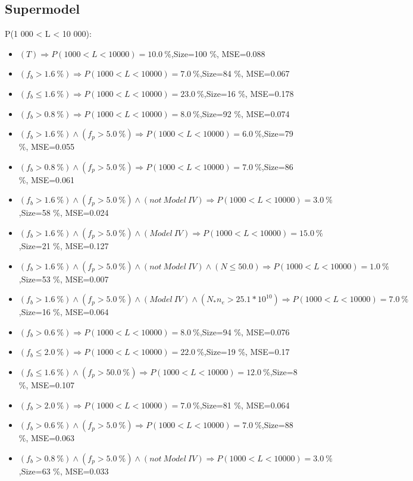\documentclass[numbered]{CSL}
\begin{document}
\subsection{Supermodel}
P(1 000 < L < 10 000):
\begin{itemize}
\item $(T) \Rightarrow P(1 000 < L < 10 000) = 10.0~\%$,\hfill Size=100 \%, MSE=0.088
\item $(f_b > 1.6~\%) \Rightarrow P(1 000 < L < 10 000) = 7.0~\%$,\hfill Size=84 \%, MSE=0.067
\item $(f_b \leq 1.6~\%) \Rightarrow P(1 000 < L < 10 000) = 23.0~\%$,\hfill Size=16 \%, MSE=0.178
\item $(f_b > 0.8~\%) \Rightarrow P(1 000 < L < 10 000) = 8.0~\%$,\hfill Size=92 \%, MSE=0.074
\item $(f_b > 1.6~\%) \land (f_p > 5.0~\%) \Rightarrow P(1 000 < L < 10 000) = 6.0~\%$,\hfill Size=79 \%, MSE=0.055
\item $(f_b > 0.8~\%) \land (f_p > 5.0~\%) \Rightarrow P(1 000 < L < 10 000) = 7.0~\%$,\hfill Size=86 \%, MSE=0.061
\item $(f_b > 1.6~\%) \land (f_p > 5.0~\%) \land (not~Model~IV) \Rightarrow P(1 000 < L < 10 000) = 3.0~\%$,\hfill Size=58 \%, MSE=0.024
\item $(f_b > 1.6~\%) \land (f_p > 5.0~\%) \land (Model~IV) \Rightarrow P(1 000 < L < 10 000) = 15.0~\%$,\hfill Size=21 \%, MSE=0.127
\item $(f_b > 1.6~\%) \land (f_p > 5.0~\%) \land (not~Model~IV) \land (N \leq 50.0) \Rightarrow P(1 000 < L < 10 000) = 1.0~\%$,\hfill Size=53 \%, MSE=0.007
\item $(f_b > 1.6~\%) \land (f_p > 5.0~\%) \land (Model~IV) \land (N_* n_e > 25.1 * 10^{10}) \Rightarrow P(1 000 < L < 10 000) = 7.0~\%$,\hfill Size=16 \%, MSE=0.064
\item $(f_b > 0.6~\%) \Rightarrow P(1 000 < L < 10 000) = 8.0~\%$,\hfill Size=94 \%, MSE=0.076
\item $(f_b \leq 2.0~\%) \Rightarrow P(1 000 < L < 10 000) = 22.0~\%$,\hfill Size=19 \%, MSE=0.17
\item $(f_b \leq 1.6~\%) \land (f_p > 50.0~\%) \Rightarrow P(1 000 < L < 10 000) = 12.0~\%$,\hfill Size=8 \%, MSE=0.107
\item $(f_b > 2.0~\%) \Rightarrow P(1 000 < L < 10 000) = 7.0~\%$,\hfill Size=81 \%, MSE=0.064
\item $(f_b > 0.6~\%) \land (f_p > 5.0~\%) \Rightarrow P(1 000 < L < 10 000) = 7.0~\%$,\hfill Size=88 \%, MSE=0.063
\item $(f_b > 0.8~\%) \land (f_p > 5.0~\%) \land (not~Model~IV) \Rightarrow P(1 000 < L < 10 000) = 3.0~\%$,\hfill Size=63 \%, MSE=0.033

\end{itemize}
\end{document}
